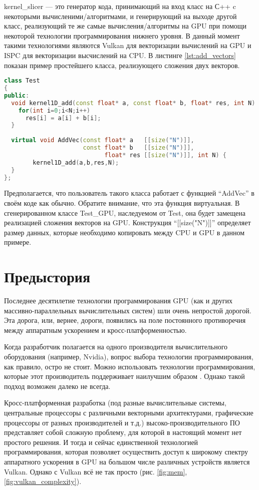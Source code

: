 \documentclass[11pt,fleqn,english,russian]{report} %
\begin{document}
kernel\_slicer --- это генератор кода, принимающий на вход класс на С++ c некоторыми вычисленими/алгоритмами, и генерирующий на выходе другой класс, реализующий те же самые вычисления/алгоритмы на GPU при помощи некоторой технологии программирования нижнего уровня. В данный момент такими технологиями являются Vulkan для векторизации вычислений на GPU и ISPC для векторизации высчислений на CPU. В листинге \ref{lst:add_vectors} показан пример простейшего класса, реализующего сложения двух векторов.

\begin{lstlisting}[language=C++, caption=сложение двух векторов]
class Test 
{
public:	
  void kernel1D_add(const float* a, const float* b, float* res, int N) {
    for(int i=0;i<N;i++)
      res[i] = a[i] + b[i];
  } 
	
  virtual void AddVec(const float* a   [[size("N")]], 
                      const float* b   [[size("N")]], 
                            float* res [[size("N")]], int N) {
		kernel1D_add(a,b,res,N); 
  } 	
};
\end{lstlisting}\label{lst:add_vectors}

Предполагается, что пользователь такого класса работает с функцией ``AddVec'' в своём коде как обычно. Обратите внимание, что эта функция виртуальная. В сгенерированном классе Test\_GPU, наследуемом от Test, она будет замещена реализацией сложения векторов на GPU. Конструкция ``[[size("N")]]'' определяет размер данных, которые необходимо копировать между CPU и GPU в данном примере.

\section{Предыстория}

Последнее десятилетие технологии программирования GPU (как и других массивно-параллельных вычислительных систем) шли очень непростой дорогой. Эта дорога, или, вернее, дороги, появились на поле постоянного противоречия между аппаратным ускорением и кросс-платформенностью. 

Когда разработчик полагается на одного производителя вычислительного оборудования (например, Nvidia), вопрос выбора технологии программирования, как правило, остро не стоит. Можно использовать технологии программирования, которые этот производитель поддерживает наилучшим образом \cite{NVCPP,CUDA,OpenACC}. Однако такой подход возможен далеко не всегда. 

Кросс-платформенная разработка (под разные вычислительные системы, центральные процессоры с различными векторными архитектурами, графические процессоры от разных производителей и т.д.)  высоко-производительного ПО представляет собой сложную проблему, для которой в настоящий момент нет простого решения. И тогда и сейчас единственной технологией программирования, которая позволяет осуществить доступ к широкому спектру аппаратного ускорения в GPU на большом числе различных устройств является Vulkan. Однако с Vulkan всё не так просто (рис. \ref{fig:mem}, \ref{fig:vulkan_complexity}). 
\end{document}
